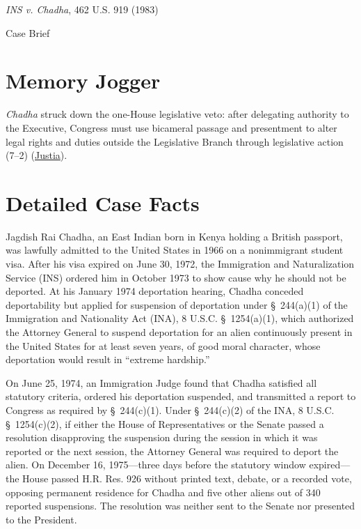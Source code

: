 \documentclass[12pt]{article}
\begin{document}
\begin{center}
{\LARGE \textit{INS v. Chadha}, 462 U.S. 919 (1983)\par}
\vspace{0.8em}
{\large Case Brief\par}
\end{center}
\vspace{1em}

\section{Memory Jogger}
\textit{Chadha} struck down the one-House legislative veto: after delegating authority to the Executive, Congress must use bicameral passage and presentment to alter legal rights and duties outside the Legislative Branch through legislative action (7--2) (\href{https://supreme.justia.com/cases/federal/us/462/919/}{Justia}).

\section{Detailed Case Facts}
Jagdish Rai Chadha, an East Indian born in Kenya holding a British passport, was lawfully admitted to the United States in 1966 on a nonimmigrant student visa. After his visa expired on June 30, 1972, the Immigration and Naturalization Service (INS) ordered him in October 1973 to show cause why he should not be deported. At his January 1974 deportation hearing, Chadha conceded deportability but applied for suspension of deportation under \S~244(a)(1) of the Immigration and Nationality Act (INA), 8 U.S.C. \S~1254(a)(1), which authorized the Attorney General to suspend deportation for an alien continuously present in the United States for at least seven years, of good moral character, whose deportation would result in ``extreme hardship.''

On June 25, 1974, an Immigration Judge found that Chadha satisfied all statutory criteria, ordered his deportation suspended, and transmitted a report to Congress as required by \S~244(c)(1). Under \S~244(c)(2) of the INA, 8 U.S.C. \S~1254(c)(2), if either the House of Representatives or the Senate passed a resolution disapproving the suspension during the session in which it was reported or the next session, the Attorney General was required to deport the alien. On December 16, 1975---three days before the statutory window expired---the House passed H.R. Res. 926 without printed text, debate, or a recorded vote, opposing permanent residence for Chadha and five other aliens out of 340 reported suspensions. The resolution was neither sent to the Senate nor presented to the President.
\end{document}
